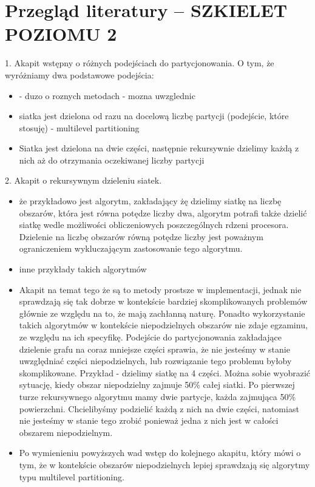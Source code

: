\newpage


\section{Przegląd literatury -- SZKIELET POZIOMU 2}
\label{sec:literature}

1. Akapit wstępny o różnych podejściach do partycjonowania.
O tym, że wyróżniamy dwa podstawowe podejścia:

\begin{itemize}
    \item {\cite{metis} - duzo o roznych metodach - mozna uwzglednic}
    \item{siatka jest dzielona od razu na docelową liczbę partycji (podejście, które stosuję) - multilevel partitioning}
    \item{Siatka jest dzielona na dwie części, następnie rekursywnie dzielimy każdą z nich aż do otrzymania oczekiwanej
    liczby partycji}
\end{itemize}

2. Akapit o rekursywnym dzieleniu siatek.
\begin{itemize}
    \item {że przykładowo jest algorytm\cite{recursive}, zakładający żę dzielimy siatkę na liczbę obszarów,
        która jest równa potędze liczby dwa, algorytm potrafi także dzielić siatkę wedle możliwości obliczeniowych
        poszczególnych rdzeni procesora. Dzielenie na liczbę obszarów równą potędze liczby jest poważnym ograniczeniem
        wykluczającym zastosowanie tego algorytmu.}
    \item{inne przykłady takich algorytmów}
    \item {Akapit na temat tego że są to metody prostsze w implementacji, jednak nie sprawdzają się tak dobrze w kontekście bardziej
    skomplikowanych problemów głównie ze względu na to, że mają zachłanną naturę.
    Ponadto wykorzystanie takich algorytmów w kontekście niepodzielnych obszarów nie zdaje egzaminu,
        ze względu na ich specyfikę. Podejście do partycjonowania zakładające dzielenie grafu na coraz mniejsze
        części sprawia, że nie jesteśmy w stanie uwzględniać części niepodzielnych, lub rozwiązanie tego problemu byłoby skomplikowane.
        Przykład - dzielimy siatkę na 4 części. Można sobie wyobrazić sytuację, kiedy obszar niepodzielny zajmuje 50\% całej siatki.
        Po pierwszej turze rekursywnego algorytmu mamy dwie partycje, każda zajmująca 50\% powierzchni. Chcielibyśmy podzielić
        każdą z nich na dwie części, natomiast nie jesteśmy w stanie tego zrobić ponieważ jedna z nich jest w całości obszarem
        niepodzielnym.}
    \item {Po wymienieniu powyższych wad wstęp do kolejnego akapitu, który mówi o tym, że w kontekście obszarów niepodzielnych
    lepiej sprawdzają się algorytmy typu multilevel partitioning.}
\end{itemize}

